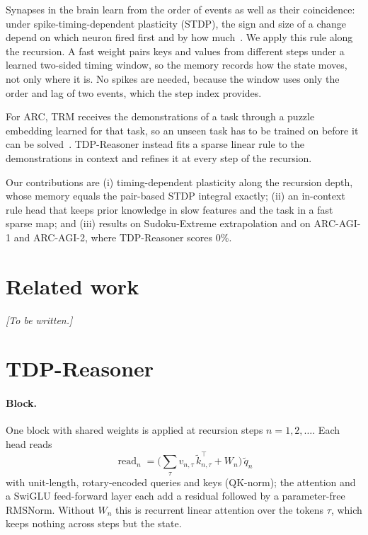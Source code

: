 \documentclass[10pt]{article}
\newcommand{\todo}[1]{\textit{[#1]}}
\newcommand{\kt}{\tilde k}
\newcommand{\qt}{\tilde q}
\begin{document}
Synapses in the brain learn from the order of events as well as their coincidence: under spike-timing-dependent
plasticity (STDP), the sign and size of a change depend on which neuron fired first and by how
much~\cite{markram1997,bi1998}. We apply this rule along the recursion. A fast weight pairs keys and values from
different steps under a learned two-sided timing window, so the memory records how the state moves, not only where it
is. No spikes are needed, because the window uses only the order and lag of two events, which the step index provides.

For ARC, TRM receives the demonstrations of a task through a puzzle embedding learned for that task, so an unseen task
has to be trained on before it can be solved~\cite{royeazar2025,mcgovern2025}. TDP-Reasoner instead fits a sparse
linear rule to the demonstrations in context and refines it at every step of the recursion.

Our contributions are (i) timing-dependent plasticity along the recursion depth, whose memory equals the pair-based
STDP integral exactly; (ii) an in-context rule head that keeps prior knowledge in slow features and the task in a fast
sparse map; and (iii) results on Sudoku-Extreme extrapolation and on ARC-AGI-1 and ARC-AGI-2, where TDP-Reasoner
scores 0\%.

\section{Related work}
\todo{To be written.}

\section{TDP-Reasoner}
\label{sec:method}

\paragraph{Block.} One block with shared weights is applied at recursion steps $n = 1, 2, \dots$. Each head reads
\begin{equation}
  \operatorname{read}_n = \Big(\textstyle\sum_{\tau} v_{n,\tau}\, \kt_{n,\tau}^{\top} + W_n\Big)\, \qt_n
  \label{eq:read}
\end{equation}
with unit-length, rotary-encoded queries and keys (QK-norm); the attention and a SwiGLU feed-forward layer each add a
residual followed by a parameter-free RMSNorm. Without $W_n$ this is recurrent linear attention over the tokens $\tau$,
which keeps nothing across steps but the state.
\end{document}
